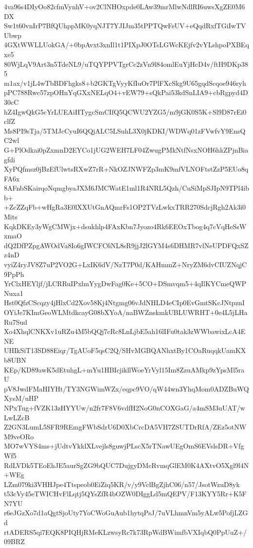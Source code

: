4va96s4DIyOo82cfmVynhV+ov2ClNHOxpde0LAw39mrMlwNdlRI6uwsXgZE0M6DX
Sw1t60vnIrP7BfQUhppMK0yqNJT7YJIJm35tPPTQwFsUV+eQqdRxfTGiIwTVUbwp
4GXtWWLLUokGA/+0bpAvxt3xnIl1t1PIXpJ0OTsLGWcKEjfv2vYLshpoPXBEqxe5
80WjLqV9Art3n5TdeNL9/uTQYPPVTgrCc2zVn9l84omlEuYjHcD4v/ftH9DKp385
m1ax/v1jL4wTbBDFhgks8+b2GKTgVyyKfIuOr7PlFXcSkg9U65gqdScqoe946ryh
pPC788Rwc57zpOHnYqGXxNELqO4+vEW79+sQkPai53kdSnLIA9+cbRgpyd4D30cC
hZ4IgwQkG5cYrLUEAiHTygcSmCIfQ5QCWU2YZG5/m9jGK0S5K+Sl9D87rEi0clfZ
Ms8PI9sTja/5TMJcCyuI6QQjALC5LSuhL3X0jKDKI/WDWq01zFVwfvY9EnsQC2wl
G+PlOdkai0pZxmnD2EYCo1jUG2WEH7LF04ZwugPMkNtfNsxNOH6hkZPjnBiagfdi
XyPQfmsz0jBzEfUlwtsRXwZ7rR+NkOZJNWFZp3mK9mfVLNOFtstZzP5EUo8qFA6x
8AFnbSKairqoNqmgbyaJXM6JMCWatE1ml1R4NRL5Qzh/CuSiMpSJIpN9TPl4ibb+
+ZcZZqFb+wHgRa3E0lXXUtGnAQmrFs1OP2TVzLwkxTRR270SdcjRgh2Ak3i0Mits
KqkDKEy3yWgCMWjx+dsukhlp4FAxKbn7Jyozo4Rk6EEOxTbog4q7cVqHeSsWxmaO
dQ2DfPZpgAWOdVa8Io6gIWCFC6NL8sR9jjJ2lGYM4s6DHMR7vlNeUPDFQxSZz4nD
vyiZ4ryJV8Z7uP2VO2G+LxIK6dV/NzT7P0d/KAHmmZ+NryZM6dvCIUZNqjC9PpPh
YrClxHEYljf/jLCRRuIPxlmYygDwFag0Ke+5CO+DSmvqm5+4qIlKYCmeQWPNuxa1
Hst0QfzCScqzy4jHlxCd2Xov58Kj4Ntgmg06vJdNHLD4eCIp0EvGmtSKcJNtpznI
OYiJe7KImGeoWLMtdkcayG08bXYoA/naBWZnskmkUBLUWRHT+0e4L5jLHaRu7Sud
Xo4XhqlCNKXv1uRZu4M5bQQj7cRc8LnLjbE5ah16lIFu0tak3zWWbawixLcA4ENE
UHIkSiT13SD88Eiqr/TgAUoF5qsC2Q/SHvMGBQANhxtBy1COaRuqqkUamKXb8UBN
KEp/KD89awK5dEtuhgL+mYu1HBIcjikllWoeYrVyl15Im8ZzuAMkp9zYpsMl5raU
pV8JwdFMaHIYHt/TY3NGWimWZx/eqpc9VO/qW44wn3YhqMom0ADZBuWQXysM/uHP
NPxTug+fVZK13zHYYUw/n2fr7F8V6vdfH2NoG0nCOXGaG/a4mSM3uUAT/wLwLZcB
Z2GN3LumL5SFR9REmgFWbSdrU6D0XbCrcDA5VH7ZSUTDrRfA/ZEz5otNWM9veORo
MO7wVYS4ms+jUdtvYkklXLvejls8guwjPLscX5rTNawUEgOmS6EVslsDR+VfgWf5
RdLVDk5TEoEhJE5aurSgZG9bQUC7DujgyDMcRvmqGlEM0K4AXtvO5Xgl9l4N+WEg
LZm079ki3VHHJpe4Ttspeob0EiZiq5KR/v/y9VclBgZjhC06/n57/JsotWzuD8yk
t53cVy45eTWICHvFlLqtj5QYsZfR4bOZW0DIggLd5mQEPV/F13KYY5Rr+K5FN7YU
r6eJGzXo7d1aQgtSjoUty7YoCWoGuAub1hytqPsJ/7uVLhmnVm5yALw5PofjLZGd
rtADERS5qi7EQK8PIQHjRMeKLzwsyRc7k73RpWdBWimfbVXIqbQ0PpUuZ+/09BRZ
